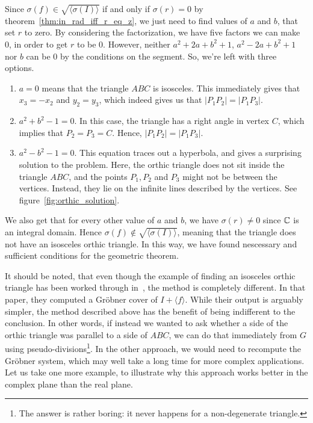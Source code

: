 \begin{example}
  Since $\sigma(f) \in \sqrt{\langle \sigma(I) \rangle}$ if and only if $\sigma(r) = 0$ by theorem~\ref{thm:in_rad_iff_r_eq_z}, we just need to find values of $a$ and $b$, that set $r$ to zero. By considering the factorization, we have five factors we can make 0, in order to get $r$ to be 0. However, neither $a^{2} + 2a + b^{2} + 1$, $a^{2} - 2a + b^{2} + 1$ nor $b$ can be $0$ by the conditions on the segment. So, we're left with three options.
  \begin{enumerate}
    \item $a = 0$ means that the triangle $ABC$ is isosceles. This immediately gives that $x_{3} = -x_{2}$ and $y_{2} = y_{3}$, which indeed gives us that $|P_{1}P_{2}| = |P_{1}P_{3}|$.
    \item $a^{2} + b^{2} - 1 = 0$. In this case, the triangle has a right angle in vertex $C$, which implies that $P_{2} = P_{3} = C$. Hence, $|P_{1}P_{2}| = |P_{1}P_{3}|$.
    \item $a^{2} - b^{2} - 1 = 0$. This equation traces out a hyperbola, and gives a surprising solution to the problem. Here, the orthic triangle does not sit inside the triangle $ABC$, and the points $P_{1}, P_{2}$ and $P_{3}$ might not be between the vertices. Instead, they lie on the infinite lines described by the vertices. See figure~\ref{fig:orthic_solution}.
  \end{enumerate}

  We also get that for every other value of $a$ and $b$, we have $\sigma(r) \neq 0$ since $\mathbb{C}$ is an integral domain. Hence $\sigma(f) \notin \sqrt{\langle \sigma(I) \rangle}$, meaning that the triangle does not have an isosceles orthic triangle. In this way, we have found nescessary and sufficient conditions for the geometric theorem.
\end{example}

It should be noted, that even though the example of finding an isosceles orthic triangle has been worked through in~\cite{MONTES20101391}, the method is completely different. In that paper, they computed a Gröbner cover of $I + \langle f \rangle$. While their output is arguably simpler, the method described above has the benefit of being indifferent to the conclusion. In other words, if instead we wanted to ask whether a side of the orthic triangle was parallel to a side of $ABC$, we can do that immediately from $G$ using pseudo-divisions\footnote{The answer is rather boring: it never happens for a non-degenerate triangle.}. In the other approach, we would need to recompute the Gröbner system, which may well take a long time for more complex applications. Let us take one more example, to illustrate why this approach works better in the complex plane than the real plane.

